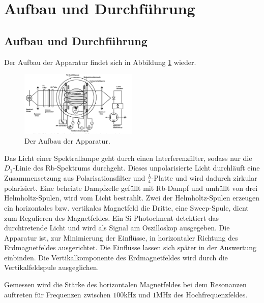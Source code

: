 \section{Aufbau und Durchführung}
\label{sec:Durchführung}
\subsection{Aufbau und Durchführung}
Der Aufbau der Apparatur findet sich in Abbildung \ref{fig:aufbau} wieder.
\begin{figure}
    \centering
    \includegraphics[width=0.5\textwidth]{aufbau.PNG}
    \caption{Der Aufbau der Apparatur.\cite{skript}}
    \label{fig:aufbau}
\end{figure}
Das Licht einer Spektrallampe geht durch einen Interferenzfilter, sodass nur die $D_\mathrm{1}$-Linie
des Rb-Spektrums durchgeht. Dieses unpolarisierte Licht durchläuft eine Zusammensetzung aus Polarisationsfilter
und $\frac{\lambda}{4}$-Platte und wird dadurch zirkular polarisiert.
Eine beheizte Dampfzelle gefüllt mit Rb-Dampf und umhüllt von drei Helmholtz-Spulen, wird vom Licht bestrahlt.
Zwei der Helmholtz-Spulen erzeugen ein horizontales bzw. vertikales Magnetfeld die Dritte, eine Sweep-Spule,
dient zum Regulieren des Magnetfeldes. Ein Si-Photoelment detektiert das durchtretende Licht und wird als Signal
am Oszilloskop ausgegeben.
Die Apparatur ist, zur Minimierung der Einflüsse, in horizontaler Richtung des Erdmagnetfeldes ausgerichtet.
Die Einflüsse lassen sich später in der Auswertung einbinden.
Die Vertikalkomponente des Erdmagnetfeldes wird durch die Vertikalfeldspule ausgeglichen.

Gemessen wird die Stärke des horizontalen Magnetfeldes bei dem Resonanzen auftreten für Frequenzen zwischen $100\si{\kilo\hertz}$ und $1\si{\mega\hertz}$
des Hochfrequenzfeldes.
